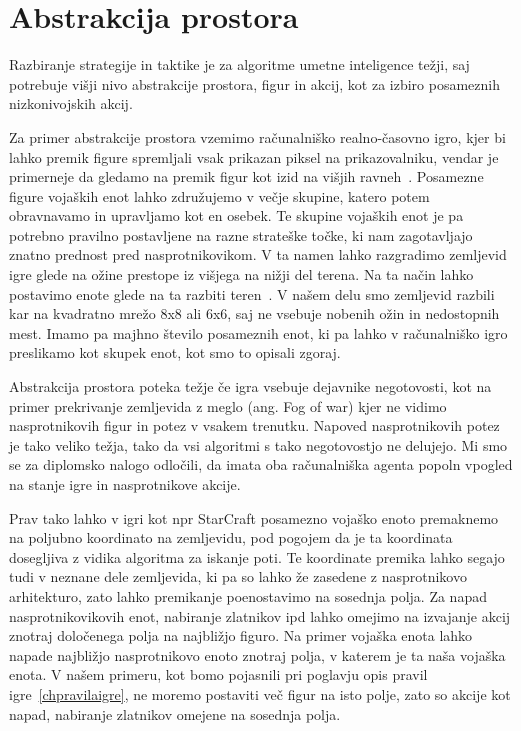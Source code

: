 \documentclass[a4paper, 12pt]{book}
\begin{document}
\section{Abstrakcija prostora}

Razbiranje strategije in taktike je za algoritme umetne inteligence težji, saj potrebuje višji nivo abstrakcije prostora, figur in akcij, kot za izbiro posameznih nizkonivojskih akcij.

Za primer abstrakcije prostora vzemimo računalniško realno-časovno igro, kjer bi lahko premik figure spremljali vsak prikazan piksel na prikazovalniku, vendar je primerneje da gledamo na premik figur kot izid na višjih ravneh~\cite{uriarte2015automatic}.
Posamezne figure vojaških enot lahko združujemo v večje skupine, katero potem obravnavamo in upravljamo kot en osebek.
Te skupine vojaških enot je pa potrebno pravilno postavljene na razne strateške točke, ki nam zagotavljajo znatno prednost pred nasprotnikovikom.
V ta namen lahko razgradimo zemljevid igre glede na ožine prestope iz višjega na nižji del terena.
Na ta način lahko postavimo enote glede na ta razbiti teren~\cite{uriarte2014game}.
V našem delu smo zemljevid razbili kar na kvadratno mrežo 8x8 ali 6x6, saj ne vsebuje nobenih ožin in nedostopnih mest.
Imamo pa majhno število posameznih enot, ki pa lahko v računalniško igro preslikamo kot skupek enot, kot smo to opisali zgoraj.

Abstrakcija prostora poteka težje če igra vsebuje dejavnike negotovosti, kot na primer prekrivanje zemljevida z meglo (ang. Fog of war) kjer ne vidimo nasprotnikovih figur in potez v vsakem trenutku. 
Napoved nasprotnikovih potez je tako veliko težja, tako da vsi algoritmi s tako negotovostjo ne delujejo.
Mi smo se za diplomsko nalogo odločili, da imata oba računalniška agenta popoln vpogled na stanje igre in nasprotnikove akcije.

Prav tako lahko v igri kot npr StarCraft posamezno vojaško enoto premaknemo na poljubno koordinato na zemljevidu, pod pogojem da je ta koordinata dosegljiva z vidika algoritma za iskanje poti.
Te koordinate premika lahko segajo tudi v neznane dele zemljevida, ki pa so lahko že zasedene z nasprotnikovo arhitekturo, zato lahko premikanje poenostavimo na sosednja polja.
Za napad nasprotnikovikovih enot, nabiranje zlatnikov ipd lahko omejimo na izvajanje akcij znotraj določenega polja na najbližjo figuro.
Na primer vojaška enota lahko napade najbližjo nasprotnikovo enoto znotraj polja, v katerem je ta naša vojaška enota.
V našem primeru, kot bomo pojasnili pri poglavju opis pravil igre~\ref{chpravilaigre}, ne moremo postaviti več figur na isto polje, zato so akcije kot napad, nabiranje zlatnikov omejene na sosednja polja.
\end{document}
